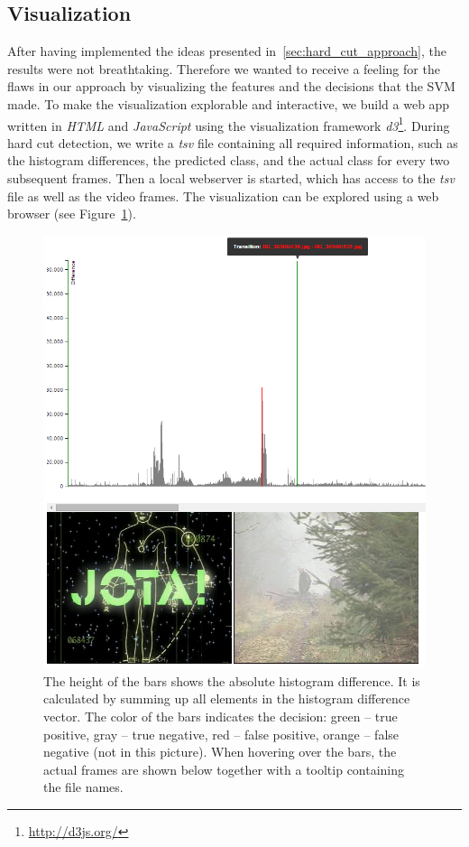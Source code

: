 \subsection{Visualization}
\label{sec:hard_cut_visualization}

After having implemented the ideas presented in~\ref{sec:hard_cut_approach}, the results were not breathtaking.
Therefore we wanted to receive a feeling for the flaws in our approach by visualizing the features and the decisions that the SVM made.
To make the visualization explorable and interactive, we build a web app written in \emph{HTML} and \emph{JavaScript} using the visualization framework \emph{d3}\footnote{\url{http://d3js.org/}}.
During hard cut detection, we write a \emph{tsv} file containing all required information, such as the histogram differences, the predicted class, and the actual class for every two subsequent frames.
Then a local webserver is started, which has access to the \emph{tsv} file as well as the video frames.
The visualization can be explored using a web browser (see Figure~\ref{fig:hard_cut_visualization}).

\begin{figure}[ht]
	\centering
	\includegraphics[scale=.5]{images/hard_cut_visualization.png}
	\caption{The height of the bars shows the absolute histogram difference.
    It is calculated by summing up all elements in the histogram difference vector.
    The color of the bars indicates the decision: green -- true positive, gray -- true negative, red -- false positive, orange -- false negative (not in this picture).
    When hovering over the bars, the actual frames are shown below together with a tooltip containing the file names.}
	\label{fig:hard_cut_visualization}
\end{figure}

